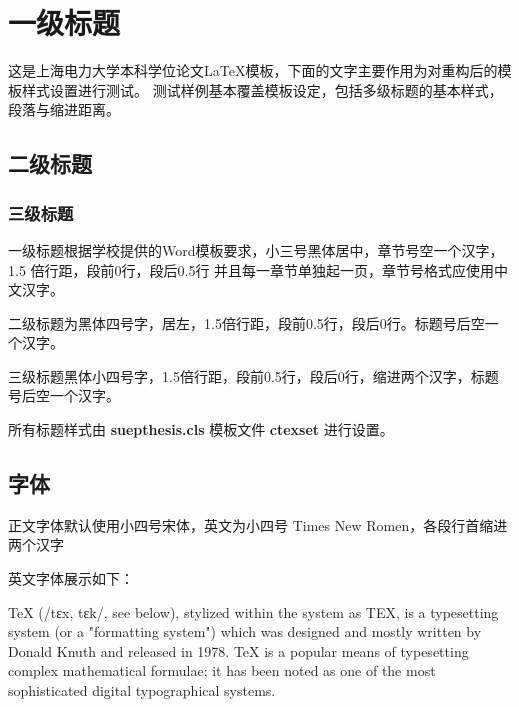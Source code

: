 %
%
%
%
%

\chapter{一级标题}

这是上海电力大学本科学位论文\LaTeX{}模板，下面的文字主要作用为对重构后的模板样式设置进行测试。
测试样例基本覆盖模板设定，包括多级标题的基本样式，段落与缩进距离。

\section{二级标题}

\subsection{三级标题}

一级标题根据学校提供的Word模板要求，小三号黑体居中，章节号空一个汉字，1.5 倍行距，段前0行，段后0.5行
并且每一章节单独起一页，章节号格式应使用中文汉字。

二级标题为黑体四号字，居左，1.5倍行距，段前0.5行，段后0行。标题号后空一个汉字。

三级标题黑体小四号字，1.5倍行距，段前0.5行，段后0行，缩进两个汉字，标题号后空一个汉字。

所有标题样式由 \textbf{suepthesis.cls} 模板文件 \textbf{ctexset} 进行设置。

\section{字体}

正文字体默认使用小四号宋体，英文为小四号 Times New Romen，各段行首缩进两个汉字



英文字体展示如下：

TeX (/tɛx, tɛk/, see below), stylized within the system as TEX, is a typesetting system (or a "formatting system") which was designed and mostly written by Donald Knuth\cite{knuth1984texbook} and released in 1978. TeX is a popular means of typesetting complex mathematical formulae; it has been noted as one of the most sophisticated digital typographical systems.



